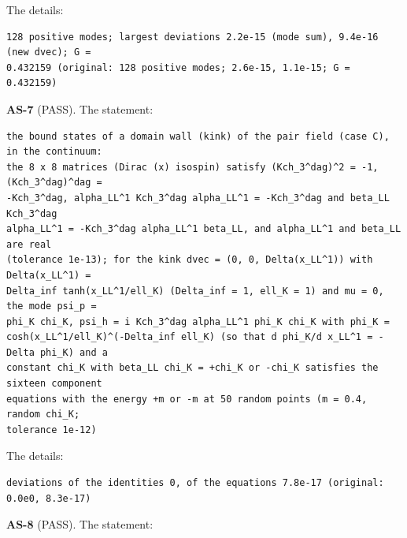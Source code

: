 \documentclass[
  10pt,
]{article}
\begin{document}
The details:

\begin{verbatim}
128 positive modes; largest deviations 2.2e-15 (mode sum), 9.4e-16 (new dvec); G =
0.432159 (original: 128 positive modes; 2.6e-15, 1.1e-15; G = 0.432159)
\end{verbatim}

\textbf{AS-7} (PASS). The statement:

\begin{verbatim}
the bound states of a domain wall (kink) of the pair field (case C), in the continuum:
the 8 x 8 matrices (Dirac (x) isospin) satisfy (Kch_3^dag)^2 = -1, (Kch_3^dag)^dag =
-Kch_3^dag, alpha_LL^1 Kch_3^dag alpha_LL^1 = -Kch_3^dag and beta_LL Kch_3^dag
alpha_LL^1 = -Kch_3^dag alpha_LL^1 beta_LL, and alpha_LL^1 and beta_LL are real
(tolerance 1e-13); for the kink dvec = (0, 0, Delta(x_LL^1)) with Delta(x_LL^1) =
Delta_inf tanh(x_LL^1/ell_K) (Delta_inf = 1, ell_K = 1) and mu = 0, the mode psi_p =
phi_K chi_K, psi_h = i Kch_3^dag alpha_LL^1 phi_K chi_K with phi_K =
cosh(x_LL^1/ell_K)^(-Delta_inf ell_K) (so that d phi_K/d x_LL^1 = -Delta phi_K) and a
constant chi_K with beta_LL chi_K = +chi_K or -chi_K satisfies the sixteen component
equations with the energy +m or -m at 50 random points (m = 0.4, random chi_K;
tolerance 1e-12)
\end{verbatim}

The details:

\begin{verbatim}
deviations of the identities 0, of the equations 7.8e-17 (original: 0.0e0, 8.3e-17)
\end{verbatim}

\textbf{AS-8} (PASS). The statement:
\end{document}
